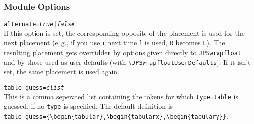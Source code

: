 \documentclass[a4paper,10pt]{scrartcl}
\newenvironment{codedescription*}{%
  \parindent=-3em
  \parskip=1em plus 2pt minus 2pt
  \vskip-\lastskip
  \hspace*{\parindent}\ignorespaces
}{\par}
\newcommand*\optionTF{\textit{true}{\normalfont|}\textit{false}}
\begin{document}
\subsubsection{Module Options}
\begin{codedescription*}
\texttt{alternate=\optionTF}\\
  If this option is set, the corresponding opposite of the placement is used for
  the next placement (e.\,g., if you use \texttt{r} next time \texttt{l} is
  used, \texttt{R} becomes \texttt{L}). The resulting placement gets overridden
  by options given directly to \texttt{JPSwrapfloat} and by those used as user
  defaults (with \verb|\JPSwrapfloatUserDefaults|). If it isn't set, the same
  placement is used again.

\texttt{table-guess=\textit{clist}}\\
  This is a comma seperated list containing the tokens for which
  \texttt{type=table} is guessed, if no \texttt{type} is specified. The default
  definition is\\
  \verb|table-guess={\begin{tabular},\begin{tabularx},\begin{tabulary}}|.
\end{codedescription*}
\end{document}
